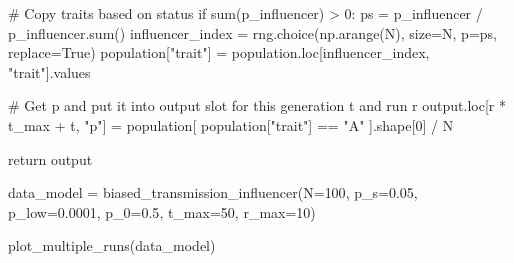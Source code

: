 \documentclass[
  a4paperpaper,
  ,captions=tableheading
]{scrbook}
\newenvironment{Shaded}{\begin{snugshade}}{\end{snugshade}}
\newcommand{\BuiltInTok}[1]{\textcolor[rgb]{0.00,0.23,0.31}{#1}}
\newcommand{\CommentTok}[1]{\textcolor[rgb]{0.37,0.37,0.37}{#1}}
\newcommand{\ControlFlowTok}[1]{\textcolor[rgb]{0.00,0.23,0.31}{#1}}
\newcommand{\DecValTok}[1]{\textcolor[rgb]{0.68,0.00,0.00}{#1}}
\newcommand{\FloatTok}[1]{\textcolor[rgb]{0.68,0.00,0.00}{#1}}
\newcommand{\NormalTok}[1]{\textcolor[rgb]{0.00,0.23,0.31}{#1}}
\newcommand{\OperatorTok}[1]{\textcolor[rgb]{0.37,0.37,0.37}{#1}}
\newcommand{\StringTok}[1]{\textcolor[rgb]{0.13,0.47,0.30}{#1}}
\newcommand{\VariableTok}[1]{\textcolor[rgb]{0.07,0.07,0.07}{#1}}
\begin{document}
\begin{Shaded}
\begin{Highlighting}[]
                \CommentTok{\# Copy traits based on status}
                \ControlFlowTok{if} \BuiltInTok{sum}\NormalTok{(p\_influencer) }\OperatorTok{\textgreater{}} \DecValTok{0}\NormalTok{:}
\NormalTok{                    ps }\OperatorTok{=}\NormalTok{ p\_influencer }\OperatorTok{/}\NormalTok{ p\_influencer.}\BuiltInTok{sum}\NormalTok{()}
\NormalTok{                    influencer\_index }\OperatorTok{=}\NormalTok{ rng.choice(np.arange(N), size}\OperatorTok{=}\NormalTok{N, p}\OperatorTok{=}\NormalTok{ps, replace}\OperatorTok{=}\VariableTok{True}\NormalTok{)}
\NormalTok{                    population[}\StringTok{"trait"}\NormalTok{] }\OperatorTok{=}\NormalTok{ population.loc[influencer\_index, }\StringTok{"trait"}\NormalTok{].values}
                
                \CommentTok{\# Get p and put it into output slot for this generation t and run r}
\NormalTok{                output.loc[r }\OperatorTok{*}\NormalTok{ t\_max }\OperatorTok{+}\NormalTok{ t, }\StringTok{"p"}\NormalTok{] }\OperatorTok{=}\NormalTok{ population[ population[}\StringTok{"trait"}\NormalTok{] }\OperatorTok{==} \StringTok{"A"}\NormalTok{ ].shape[}\DecValTok{0}\NormalTok{] }\OperatorTok{/}\NormalTok{ N}
                
    \ControlFlowTok{return}\NormalTok{ output}
\end{Highlighting}
\end{Shaded}

\begin{Shaded}
\begin{Highlighting}[]
\NormalTok{data\_model }\OperatorTok{=}\NormalTok{ biased\_transmission\_influencer(N}\OperatorTok{=}\DecValTok{100}\NormalTok{, p\_s}\OperatorTok{=}\FloatTok{0.05}\NormalTok{, p\_low}\OperatorTok{=}\FloatTok{0.0001}\NormalTok{, p\_0}\OperatorTok{=}\FloatTok{0.5}\NormalTok{, t\_max}\OperatorTok{=}\DecValTok{50}\NormalTok{, r\_max}\OperatorTok{=}\DecValTok{10}\NormalTok{)}
\end{Highlighting}
\end{Shaded}

\begin{Shaded}
\begin{Highlighting}[]
\NormalTok{plot\_multiple\_runs(data\_model)}
\end{Highlighting}
\end{Shaded}
\end{document}
